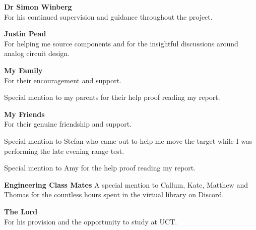 \textbf{Dr Simon Winberg}\\
For his continued supervision and guidance throughout the project.

\textbf{Justin Pead}\\
For helping me source components and for the insightful discussions around analog circuit design.

\textbf{My Family}\\
For their encouragement and support.

Special mention to my parents for their help proof reading my report.

\textbf{My Friends}\\
For their genuine friendship and support.

Special mention to Stefan who came out to help me move the target while I was performing the late evening range test.

Special mention to Amy for the help proof reading my report.

\textbf{Engineering Class Mates}
A special mention to Callum, Kate, Matthew and Thomas for the countless hours spent in the virtual library on Discord.

\textbf{The Lord}\\
For his provision and the opportunity to study at UCT.


